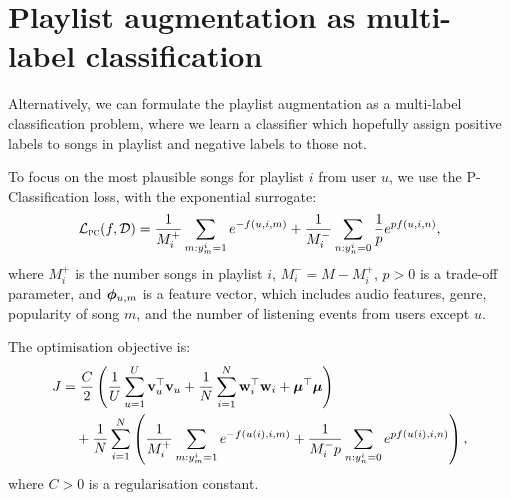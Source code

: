 \section{Playlist augmentation as multi-label classification}

Alternatively, we can formulate the playlist augmentation as a multi-label classification problem,
where we learn a classifier which hopefully assign positive labels to songs in playlist and negative labels to those not.

To focus on the most plausible songs for playlist $i$ from user $u$,
we use the P-Classification loss, with the exponential surrogate:
\begin{equation*}
\begin{aligned}
\mathcal{L}_\textsc{pc}(f, \mathcal{D}) 
&= \frac{1}{M_i^+} \sum_{m: y_m^i = 1} e^{-f(u, i, m)} + \frac{1}{M_i^-} \sum_{n: y_n^i = 0} \frac{1}{p} e^{p f(u, i, n)}, \\
\end{aligned}
\end{equation*}
where $M_i^+$ is the number songs in playlist $i$,
$M_i^- = M - M_i^+$,
$p > 0$ is a trade-off parameter,
and $\bm{\phi}_{u,m}$ is a feature vector,
which includes audio features, genre, popularity of song $m$,
and the number of listening events from users except $u$.

The optimisation objective is:
\begin{equation*}
\begin{aligned}
J &= \frac{C}{2} \left( \frac{1}{U} \sum_{u=1}^U \mathbf{v}_u^\top \mathbf{v}_u 
     + \frac{1}{N} \sum_{i=1}^N \mathbf{w}_i^\top \mathbf{w}_i + \bm{\mu}^\top \bm{\mu} \right) \\
& \hspace{1em}
     + \frac{1}{N} \sum_{i=1}^N \left( \frac{1}{M_i^+} \sum_{m: y_m^i = 1} e^{-f(u(i), i,m)} 
     + \frac{1}{M_i^- p} \sum_{n: y_n^i = 0} e^{p f(u(i), i,n)} \right),
\end{aligned}
\end{equation*}
where $C > 0$ is a regularisation constant.
